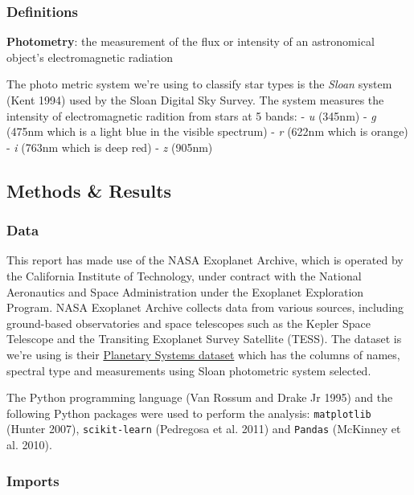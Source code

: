 \documentclass[
  letterpaper,
  DIV=11,
  numbers=noendperiod]{scrartcl}
\begin{document}
\subsubsection{Definitions}\label{definitions}

\textbf{Photometry}: the measurement of the flux or intensity of an
astronomical object's electromagnetic radiation

The photo metric system we're using to classify star types is the
\emph{Sloan} system (Kent 1994) used by the Sloan Digital Sky Survey.
The system measures the intensity of electromagnetic radition from stars
at 5 bands: - \emph{u} (345nm) - \emph{g} (475nm which is a light blue
in the visible spectrum) - \emph{r} (622nm which is orange) - \emph{i}
(763nm which is deep red) - \emph{z} (905nm)

\subsection{Methods \& Results}\label{methods-results}

\subsubsection{Data}\label{data}

This report has made use of the NASA Exoplanet Archive, which is
operated by the California Institute of Technology, under contract with
the National Aeronautics and Space Administration under the Exoplanet
Exploration Program. NASA Exoplanet Archive collects data from various
sources, including ground-based observatories and space telescopes such
as the Kepler Space Telescope and the Transiting Exoplanet Survey
Satellite (TESS). The dataset is we're using is their
\href{https://exoplanetarchive.ipac.caltech.edu/cgi-bin/TblView/nph-tblView?app=ExoTbls&config=PS}{Planetary
Systems dataset} which has the columns of names, spectral type and
measurements using Sloan photometric system selected.

The Python programming language (Van Rossum and Drake Jr 1995) and the
following Python packages were used to perform the analysis:
\texttt{matplotlib} (Hunter 2007), \texttt{scikit-learn} (Pedregosa et
al. 2011) and \texttt{Pandas} (McKinney et al. 2010).

\subsubsection{Imports}\label{imports}
\end{document}
